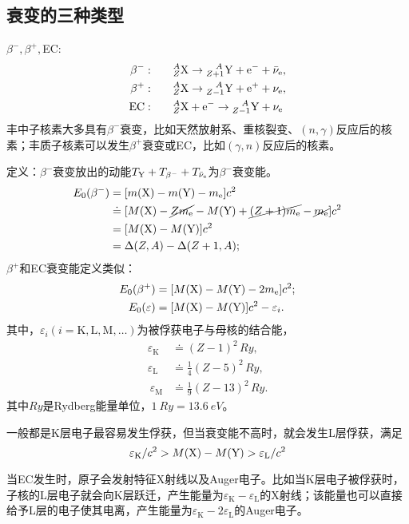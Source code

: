 \subsection{\textbeta 衰变的三种类型}

$\beta^-,\beta^+,$EC:
\begin{align}
	\beta^-:&\qquad{^A_Z\mathrm{X}} \to {^{\quad\!A}_{Z+1}\mathrm{Y}} + \mathrm e^- + \bar\nu_\mathrm e,\\
	\beta^+:&\qquad{^A_Z\mathrm{X}} \to {^{\quad\!A}_{Z-1}\mathrm{Y}} + \mathrm e^+ + \nu_\mathrm e,\\
	\mathrm{EC}:&\qquad{^A_Z\mathrm{X}} + \mathrm e^- \to {^{\quad\!A}_{Z-1}\mathrm{Y}} + \nu_\mathrm e
\end{align}
丰中子核素大多具有$\beta^-$衰变，比如天然放射系、重核裂变、$(n,\gamma)$反应后的核素；丰质子核素可以发生$\beta^+$衰变或EC，比如$(\gamma,n)$反应后的核素。

定义：$\beta^-$衰变放出的动能$T_{\mathrm{Y}}+T_{\beta^-}+T_{\bar\nu_\mathrm e}$为$\beta^-$衰变能。
\begin{align}\notag
	E_0(\beta^-)&=[m(\mathrm{X})-m(\mathrm{Y})-m_\mathrm e]c^2\\\notag
	&\doteq[M(\mathrm{X})-\cancel{Zm_\mathrm e}-M(\mathrm{Y})+\cancel{(Z+1)m_\mathrm e}-\cancel{m_\mathrm e}]c^2\\
	&=[M(\mathrm{X})-M(\mathrm{Y})]c^2\\\notag
	&=\Delta(Z,A)-\Delta(Z+1,A);
\end{align}
$\beta^+$和EC衰变能定义类似：
\begin{align}
	E_0(\beta^+)&=[M(\mathrm{X})-M(\mathrm{Y})-2m_\mathrm e]c^2;\\
	E_0(\varepsilon)&=[M(\mathrm{X})-M(\mathrm{Y})]c^2-\varepsilon_i.
\end{align}
其中，$\varepsilon_i(i=\mathrm{K,L,M,}\ldots)$为被俘获电子与母核的结合能，
\begin{align*}
	\varepsilon_{\mathrm K}&\doteq(Z-1)^2\,\si{Ry},\\
	\varepsilon_{\mathrm L}&\doteq\frac14(Z-5)^2\,\si{Ry},\\\
	\varepsilon_{\mathrm M}&\doteq\frac19(Z-13)^2\,\si{Ry}.
\end{align*}
其中$\si{Ry}$是Rydberg能量单位，$\SI{1}{Ry}=\SI{13.6}{eV}$。

一般都是K层电子最容易发生俘获，但当衰变能不高时，就会发生L层俘获，满足
\[
	\varepsilon_\mathrm K / c^2 > M(\mathrm{X})-M(\mathrm{Y}) > \varepsilon_\mathrm L / c^2
\]

当EC发生时，原子会发射特征X射线以及Auger电子。比如当K层电子被俘获时，子核的L层电子就会向K层跃迁，产生能量为$\varepsilon_\mathrm K - \varepsilon_\mathrm L$的X射线；该能量也可以直接给予L层的电子使其电离，产生能量为$\varepsilon_\mathrm K - 2\varepsilon_{\mathrm L}$的Auger电子。

